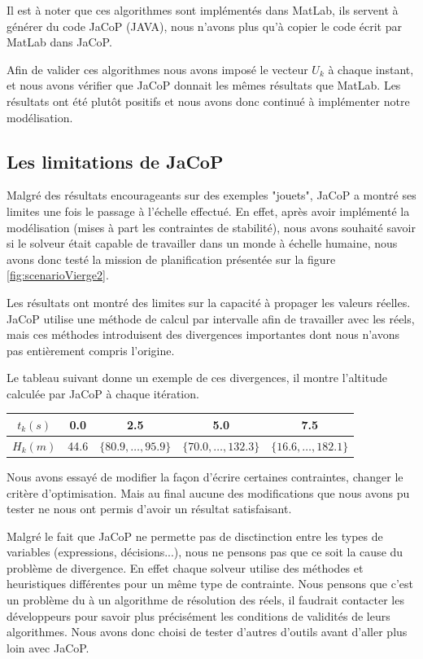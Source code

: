 	Il est à noter que ces algorithmes sont implémentés dans MatLab, ils servent à générer du code JaCoP (JAVA), nous n'avons plus qu'à copier le code écrit par MatLab dans JaCoP.
	
	Afin de valider ces algorithmes nous avons imposé le vecteur $U_k$ à chaque instant, et nous avons vérifier que JaCoP donnait les mêmes résultats que MatLab. Les résultats ont été plutôt positifs et nous avons donc continué à implémenter notre modélisation.
	
	\subsection{Les limitations de JaCoP}
	Malgré des résultats encourageants sur des exemples "jouets", JaCoP a montré ses limites une fois le passage à l'échelle effectué. En effet, après avoir implémenté la modélisation (mises à part les contraintes de stabilité), nous avons souhaité savoir si le solveur était capable de travailler dans un monde à échelle humaine, nous avons donc testé la mission de planification présentée sur la figure \ref{fig:scenarioVierge2}.
	
	Les résultats ont montré des limites sur la capacité à propager les valeurs réelles. JaCoP utilise une méthode de calcul par intervalle afin de travailler avec les réels, mais ces méthodes introduisent des divergences importantes dont nous n'avons pas entièrement compris l'origine.
	
	Le tableau suivant donne un exemple de ces divergences, il montre l'altitude calculée par JaCoP à chaque itération.
	\begin{center}
		\begin{tabular}{|c|c|c|c|c|}
			\hline $t_k (s)$ & 0.0 & 2.5 & 5.0 & 7.5 \\ 
			\hline $H_k (m)$ & 44.6 & $\{80.9, \ldots, 95.9\}$ & $\{70.0, \ldots, 132.3\}$ & $\{16.6, \ldots, 182.1\}$ \\ 
			\hline 
		\end{tabular} 
	\end{center} 	
	
	Nous avons essayé de modifier la façon d'écrire certaines contraintes, changer le critère d'optimisation. Mais au final aucune des modifications que nous avons pu tester ne nous ont permis d'avoir un résultat satisfaisant.
	
	Malgré le fait que JaCoP ne permette pas de disctinction entre les types de variables (expressions, décisions...), nous ne pensons pas que ce soit la cause du problème de divergence. En effet chaque solveur utilise des méthodes et heuristiques différentes pour un même type de contrainte. 
	Nous pensons que c'est un problème du à un algorithme de résolution des réels, il faudrait contacter les développeurs pour savoir plus précisément les conditions de validités de leurs algorithmes.
	Nous avons donc choisi de tester d'autres d'outils avant d'aller plus loin avec JaCoP.
	
